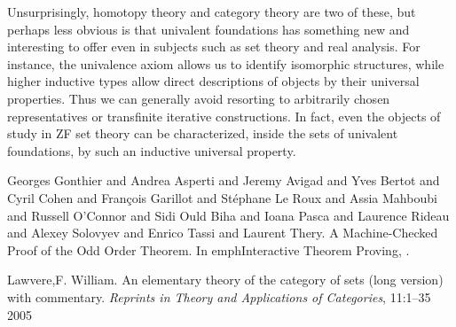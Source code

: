 \documentclass[12pt]{article}
\begin{document}
Unsurprisingly, homotopy theory and category theory are two of these, but perhaps less obvious is that univalent foundations has something new and interesting to offer even in subjects such as set theory and real analysis.
For instance, the univalence axiom allows us to identify isomorphic structures, while higher inductive types allow direct descriptions of objects by their universal properties.
Thus we can generally avoid resorting to arbitrarily chosen representatives or transfinite iterative constructions.
In fact, even the objects of study in ZF set theory can be characterized, inside the sets of univalent foundations, by such an inductive universal property.

%


\begin{thebibliography}{99}

 {Georges Gonthier and Andrea Asperti and Jeremy Avigad and Yves Bertot and Cyril Cohen and Fran{\c c}ois Garillot and St{\'e}phane Le Roux and Assia Mahboubi and Russell O'Connor and Sidi Ould Biha and Ioana Pasca and Laurence Rideau and Alexey Solovyev and Enrico Tassi and Laurent Thery}. {A Machine-Checked Proof of the Odd Order Theorem}. In emph{Interactive Theorem Proving}, .

 {Lawvere,F. William}. {An elementary theory of the category of sets (long version) with commentary}. \emph{Reprints in Theory and Applications of Categories}, {11}:{1--35} {2005}

\end{thebibliography}
\end{document}
